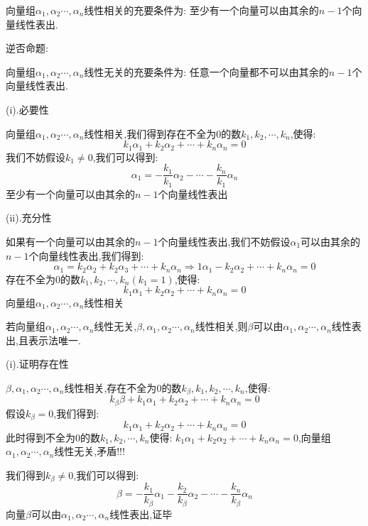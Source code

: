 \begin{theorem}[判别线性相关性的七大定理]
	
	 向量组$\alpha_{1},\alpha_{2}\cdots,\alpha_{n}$线性相关的充要条件为:  至少有一个向量可以由其余的$n-1$个向量线性表出.
	 
	 逆否命题:  
	 
	 向量组$\alpha_{1},\alpha_{2}\cdots,\alpha_{n}$线性无关的充要条件为:  任意一个向量都不可以由其余的$n-1$个向量线性表出.
	 \begin{anymark}[证明]
	 	(i).必要性
	 	
	 	向量组$\alpha_{1},\alpha_{2}\cdots,\alpha_{n}$线性相关,我们得到存在不全为$0$的数$k_{1},k_{2},\cdots,k_{n}$,使得:  
	 	$$k_{1}\alpha_{1}+k_{2}\alpha_{2}+\cdots+k_{n}\alpha_{n}=0$$
	 	我们不妨假设$k_{1}\neq 0$,我们可以得到:  
	 	$$\alpha_{1}=-\frac{k_{1}}{k_{1}}\alpha_{2}-\cdots-\frac{k_{n}}{k_{1}}\alpha_{n}$$
	 	至少有一个向量可以由其余的$n-1$个向量线性表出
	 	
	 	(ii).充分性
	 	
	 	如果有一个向量可以由其余的$n-1$个向量线性表出,我们不妨假设$\alpha_{1}$可以由其余的$n-1$个向量线性表出,我们得到:  
	 	$$\alpha_{1}=k_{2}\alpha_{2}+k_{2}\alpha_{3}+\cdots+k_{n}\alpha_{n}\Rightarrow 1\alpha_{1}-k_{2}\alpha_{2}+\cdots+k_{n}\alpha_{n}=0$$
	 	存在不全为$0$的数$k_{1},k_{2},\cdots,k_{n}(k_{1}=1)$,使得:  
	 	$$k_{1}\alpha_{1}+k_{2}\alpha_{2}+\cdots+k_{n}\alpha_{n}=0$$
	 	向量组$\alpha_{1},\alpha_{2}\cdots,\alpha_{n}$线性相关
	 \end{anymark}
	
	若向量组$\alpha_{1},\alpha_{2}\cdots,\alpha_{n}$线性无关,$\beta,\alpha_{1},\alpha_{2}\cdots,\alpha_{n}$线性相关,则$\beta$可以由$\alpha_{1},\alpha_{2}\cdots,\alpha_{n}$线性表出,且表示法唯一.
	\begin{anymark}[证明]
		(i).证明存在性
		
		$\beta,\alpha_{1},\alpha_{2}\cdots,\alpha_{n}$线性相关,存在不全为$0$的数$k_{\beta},k_{1},k_{2},\cdots,k_{n}$,使得:  
		$$k_{\beta}\beta+k_{1}\alpha_{1}+k_{2}\alpha_{2}+\cdots+k_{n}\alpha_{n}=0$$
		假设$k_{\beta}=0$,我们得到:  
		$$k_{1}\alpha_{1}+k_{2}\alpha_{2}+\cdots+k_{n}\alpha_{n}=0$$
		此时得到不全为$0$的数$k_{1},k_{2},\cdots,k_{n}$使得:  $k_{1}\alpha_{1}+k_{2}\alpha_{2}+\cdots+k_{n}\alpha_{n}=0$,向量组$\alpha_{1},\alpha_{2}\cdots,\alpha_{n}$线性无关,矛盾!!!
		
		我们得到$k_{\beta}\neq 0$,我们可以得到:  
		$$\beta=-\frac{k_{1}}{k_{\beta}}\alpha_{1}-\frac{k_{2}}{k_{\beta}}\alpha_{2}-\cdots-\frac{k_{n}}{k_{\beta}}\alpha_{n}$$
		向量$\beta$可以由$\alpha_{1},\alpha_{2}\cdots,\alpha_{n}$线性表出,证毕
		

\end{anymark}
\end{theorem}

